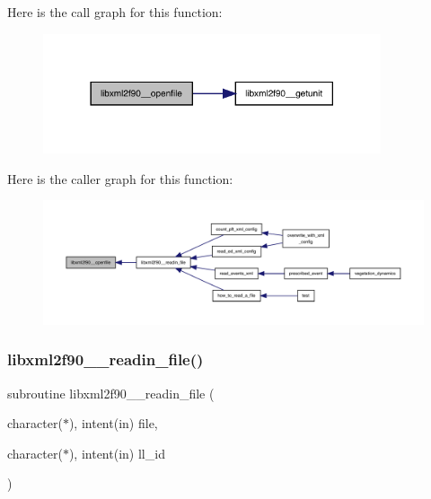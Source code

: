 Here is the call graph for this function\+:
\nopagebreak
\begin{figure}[H]
\begin{center}
\leavevmode
\includegraphics[width=282pt]{libxml2f90_8f90__pp_8f90_afd27bcb20bad3d7a8445a9090dcd8d01_cgraph}
\end{center}
\end{figure}
Here is the caller graph for this function\+:
\nopagebreak
\begin{figure}[H]
\begin{center}
\leavevmode
\includegraphics[width=350pt]{libxml2f90_8f90__pp_8f90_afd27bcb20bad3d7a8445a9090dcd8d01_icgraph}
\end{center}
\end{figure}
\mbox{\label{libxml2f90_8f90__pp_8f90_a9bbaec04b4014748bfea3b37b0a13f4a}} 
\subsubsection{\texorpdfstring{libxml2f90\+\_\+\+\_\+readin\+\_\+file()}{libxml2f90\_\_readin\_file()}}
{\footnotesize\ttfamily subroutine libxml2f90\+\_\+\+\_\+readin\+\_\+file (\begin{DoxyParamCaption}\item[{character($\ast$), intent(in)}]{file,  }\item[{character($\ast$), intent(in)}]{ll\+\_\+id }\end{DoxyParamCaption})}

